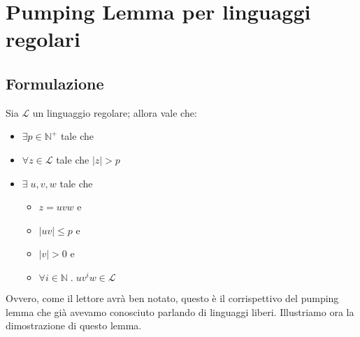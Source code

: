 \documentclass[class=book, crop=false, oneside, 12pt]{standalone}
\begin{document}
\section{Pumping Lemma per linguaggi regolari}
\subsection{Formulazione}
\begin{lemma}
    Sia \(\mathcal{L}\) un linguaggio regolare; allora vale che:
    \begin{itemize}
        \item \(\exists p \in \mathbb{N}^+\) tale che 
        \item \(\forall z \in \mathcal{L}\) tale che \(|z|>p\)
        \item \(\exists \;u, v, w\) tale che
        \begin{itemize}
            \item \(z = uvw\)  e
            \item \(|uv| \le p\)  e
            \item \(|v| > 0\)  e
            \item \(\forall i \in \mathbb{N} \; . \; uv^iw \in \mathcal{L}\)
        \end{itemize}
    \end{itemize}
\end{lemma}
\noindent Ovvero, come il lettore avrà ben notato, questo è il corrispettivo del pumping lemma che già avevamo conosciuto parlando di linguaggi liberi. Illustriamo ora la dimostrazione di questo lemma.
\end{document}
